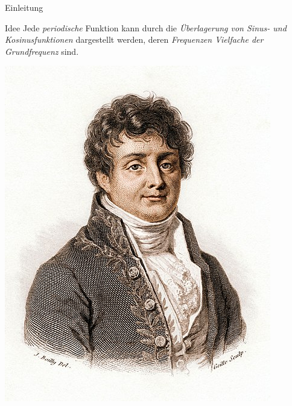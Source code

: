 \documentclass[12pt]{beamer}
\begin{document}
\begin{frame}{Einleitung}
\begin{minipage}{0.79\linewidth}
	\begin{block}{Idee}
		Jede \textit{periodische} Funktion kann durch die \textit{Überlagerung von Sinus- und Kosinusfunktionen} dargestellt werden, deren \textit{Frequenzen Vielfache der Grundfrequenz} sind.
	\end{block}
\end{minipage}
\begin{minipage}{0.19\linewidth}
	\includegraphics[width=\linewidth]{fourier.jpg}
\end{minipage}

\end{frame}
\end{document}
